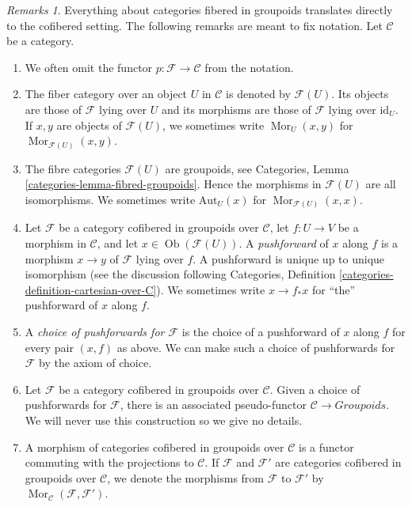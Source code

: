 \documentclass{stacks-project}
\theoremstyle{plain}
\theoremstyle{definition}
\theoremstyle{remark}
\newtheorem{remarks}[subsection]{Remarks}
\numberwithin{equation}{subsection}
\def\Mor{\mathop{\mathrm{Mor}}\nolimits}
\def\Ob{\mathop{\mathrm{Ob}}\nolimits}
\begin{document}
\begin{remarks}
\label{remarks-cofibered-groupoids}
Everything about categories fibered in groupoids translates directly to the
cofibered setting. The following remarks are meant to fix notation.
Let $\mathcal{C}$ be a category.
\begin{enumerate}
\item We often omit the functor $p: \mathcal{F} \to \mathcal{C}$ from the
notation.
\item The fiber category over an object $U$ in $\mathcal{C}$ is denoted by
$\mathcal{F}(U)$. Its objects are those of $\mathcal{F}$ lying over $U$ and its
morphisms are those of $\mathcal{F}$ lying over $\text{id}_U$.
If $x, y$  are objects of $\mathcal{F}(U)$, we sometimes write
$\Mor_U(x, y)$ for $\Mor_{\mathcal{F}(U)}(x, y)$.
\item The fibre categories $\mathcal{F}(U)$ are groupoids, see
Categories, Lemma \ref{categories-lemma-fibred-groupoids}.
Hence the morphisms in $\mathcal{F}(U)$ are all isomorphisms.
We sometimes write $\text{Aut}_U(x)$ for $\Mor_{\mathcal{F}(U)}(x, x)$.
\item
\label{item-pushforward}
Let $\mathcal{F}$ be a category cofibered in groupoids over
$\mathcal{C}$, let $f: U \to V$ be a morphism in $\mathcal{C}$, and
let $x \in \Ob(\mathcal{F}(U))$.
A {\it pushforward} of $x$ along $f$ is a morphism
$x \to y$ of $\mathcal{F}$ lying over $f$. A pushforward
is unique up to unique isomorphism (see the discussion following
Categories, Definition \ref{categories-definition-cartesian-over-C}).
We sometimes write $x \to f_*x$ for ``the'' pushforward of $x$
along $f$.
\item A {\it choice of pushforwards for $\mathcal{F}$} is the choice of
a pushforward of $x$ along $f$ for every pair $(x, f)$ as above. We can make
such a choice of pushforwards for $\mathcal{F}$ by the axiom of choice.
\item Let $\mathcal{F}$ be a category cofibered in groupoids over
$\mathcal{C}$. Given a choice of pushforwards for $\mathcal{F}$, there
is an associated pseudo-functor $\mathcal{C} \to \textit{Groupoids}$.
We will never use this construction so we give no details.
\item
\label{item-cofibered-morphism}
A morphism of categories cofibered in groupoids over $\mathcal{C}$ is a
functor commuting with the projections to $\mathcal{C}$. If $\mathcal{F}$
and $\mathcal{F}'$ are categories cofibered in groupoids over
$\mathcal{C}$, we denote the morphisms from $\mathcal{F}$ to $\mathcal{F}'$
by $\Mor_\mathcal{C}(\mathcal{F}, \mathcal{F}')$.

\end{enumerate}
\end{remarks}
\end{document}
